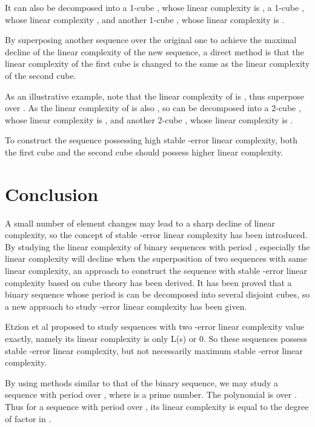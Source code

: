 \documentclass[10pt,conference,twocolumn]{IEEEtran}
\begin{document}
It can also be decomposed into a 1-cube , whose linear
complexity is , a 1-cube , whose linear complexity
, and another 1-cube , whose linear complexity is
.



By superposing another sequence over the original one to achieve the
maximal decline of the linear complexity of the new sequence, a
direct method is that the linear complexity of the first cube is
changed to the same as the linear complexity of the second cube.

As an illustrative example, note that the linear complexity of
 is , thus superpose   over
. As the linear complexity of
 is also , so
 can be decomposed into a 2-cube
, whose linear complexity is , and another
2-cube , whose linear complexity is .

To construct the sequence possessing high stable -error linear
complexity, both the first cube and the second cube should possess
higher linear complexity.





\section{Conclusion}

A small number of element changes may lead to a sharp decline of
linear complexity, so the concept of stable -error linear
complexity has been introduced. By studying the linear complexity of
binary sequences with period , especially the linear complexity
will decline when the superposition of two sequences with same
linear complexity, an approach to construct the sequence with stable
-error linear complexity based on cube theory has been derived.
It has been proved that a binary sequence whose period is  can
be decomposed into several disjoint cubes, so a new approach to
study -error linear complexity has been given.

Etzion et al \cite{Etzion} proposed to study sequences with two
-error linear complexity value exactly, namely its linear
complexity is only L(s) or 0. So these sequences possess stable
-error linear complexity, but not necessarily maximum stable
-error linear complexity.

By using methods similar to that of the binary sequence, we may
study a sequence with period  over , where  is a prime
number. The polynomial  is over . Thus
for a sequence with period  over , its linear complexity
is equal to the degree of factor  in .
\end{document}
